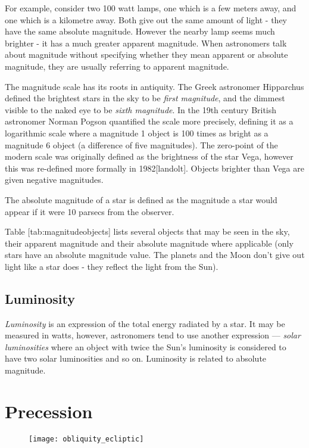 For example, consider two 100 watt lamps, one which is a few meters
away, and one which is a kilometre away. Both give out the same amount
of light - they have the same absolute magnitude. However the nearby
lamp seems much brighter - it has a much greater apparent magnitude.
When astronomers talk about magnitude without specifying whether they
mean apparent or absolute magnitude, they are usually referring to
apparent magnitude.

The magnitude scale has its roots in antiquity. The Greek astronomer
Hipparchus defined the brightest stars in the sky to be \emph{first
magnitude}, and the dimmest visible to the naked eye to be \emph{sixth
magnitude}. In the 19th century British astronomer Norman Pogson
quantified the scale more precisely, defining it as a logarithmic scale
where a magnitude 1 object is 100 times as bright as a magnitude 6
object (a difference of five magnitudes). The zero-point of the modern
scale was originally defined as the brightness of the star Vega, however
this was re-defined more formally in 1982{[}landolt{]}. Objects brighter
than Vega are given negative magnitudes.

The absolute magnitude of a star is defined as the magnitude a star
would appear if it were 10 parsecs from the observer.

Table {[}tab:magnitudeobjects{]} lists several objects that may be seen
in the sky, their apparent magnitude and their absolute magnitude where
applicable (only stars have an absolute magnitude value. The planets and
the Moon don't give out light like a star does - they reflect the light
from the Sun).

\subsection{Luminosity}\label{luminosity}

\emph{Luminosity} is an expression of the total energy radiated by a
star. It may be measured in watts, however, astronomers tend to use
another expression --- \emph{solar luminosities} where an object with
twice the Sun's luminosity is considered to have two solar luminosities
and so on. Luminosity is related to absolute magnitude.

\section{Precession}\label{precession}

\begin{figure}[h]
\centering\texttt{[image: obliquity\_ecliptic]}
\end{figure}

